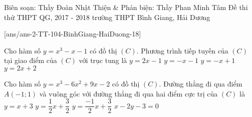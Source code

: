 \begin{name}
{Biên soạn: Thầy Đoàn Nhật Thiện \& Phản biện: Thầy Phan Minh Tâm}
{Đề thi thử THPT QG, 2017 - 2018 trường THPT Bình Giang, Hải Dương}
\end{name}
\setcounter{ex}{0}\setcounter{bt}{0}
[ans/ans-2-TT-104-BinhGiang-HaiDuong-18]
\begin{ex}%
	Cho hàm số $y=x^3-x-1$ có đồ thị $(C)$. Phương trình tiếp tuyến của $(C)$ tại giao điểm của $(C)$ với trục tung là
	\choice
	{$y=2x-1$	}
	{\True $y=-x-1$	}
	{$y=-x+1$	}
	{$y=2x+2$}
\end{ex}
\begin{ex}%
	Cho hàm số $y=x^3-6x^2+9x-2$ có đồ thị $(C)$. Đường thẳng đi qua điểm $A(-1;1)$ và vuông góc với đường thẳng đi qua hai điểm cực trị của $(C)$ là 
	\choice
	{$y=x+3$	}
	{\True $y=\dfrac{1}{2}x+\dfrac{3}{2}$	}
	{$y=\dfrac{-1}{2}x+\dfrac{3}{2}$	}
	{$x-2y-3=0$ }
\end{ex}
